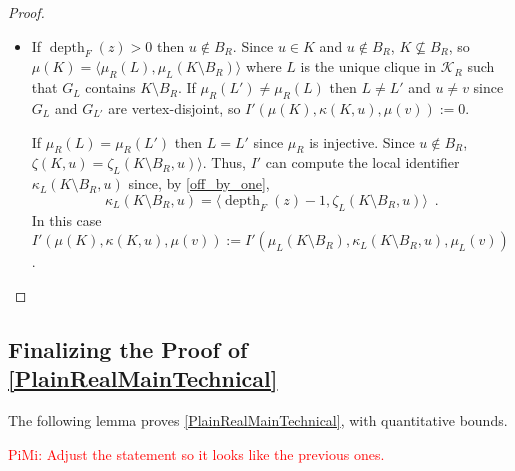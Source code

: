 \documentclass{patmorin}
\let\eqref\cref
\newcommand{\vida}[1]{\noindent{\color{pink} VD: #1}}
\newcommand{\gwen}[1]{\noindent\textcolor{Purple}{GJ: #1}}
\newcommand{\piotr}[1]{\noindent\textcolor{red}{PiMi: #1}}
\DeclareMathOperator{\depth}{depth}
\begin{document}
\begin{proof}
\begin{itemize}
\begin{itemize}
        \item If $\depth_F(z)>0$ then $u\not\in B_R$.  Since $u\in K$ and $u\not\in B_R$, $K\not\subseteq B_R$, so $\mu(K)=\langle \mu_R(L),\mu_{L}(K\setminus B_R)\rangle$ where $L$ is the unique clique in $\mathcal{K}_R$ such that $G_L$ contains $K\setminus B_R$.  If $\mu_R(L')\neq \mu_R(L)$ then $L\neq L'$ and $u\neq v$ since $G_{L}$ and $G_{L'}$ are vertex-disjoint, so $I'(\mu(K),\kappa(K,u),\mu(v)):=0$.

        If $\mu_R(L)=\mu_R(L')$ then $L=L'$ since $\mu_R$ is injective.
        Since $u\not\in B_R$,  $\zeta(K,u)=\zeta_L(K\setminus B_R,u)\rangle$.
        Thus, $I'$ can compute the local identifier $\kappa_L(K\setminus B_R,u)$ since, by \eqref{off_by_one},
        \[
           \kappa_L(K\setminus B_R,u) = \langle \depth_F(z)-1, \zeta_L(K\setminus B_R,u)\rangle\enspace.
        \]
        In this case $I'(\mu(K),\kappa(K,u),\mu(v)):=I'(\mu_L(K\setminus B_R),\kappa_L(K\setminus B_R,u),\mu_L(v))$. \qedhere
    \end{itemize}
  \end{itemize}
  \end{proof}



\subsection{Finalizing the Proof of \cref{PlainRealMainTechnical}}


The following lemma proves \cref{PlainRealMainTechnical}, with quantitative bounds.

\piotr{Adjust the statement so it looks like the previous ones.}
\end{document}
